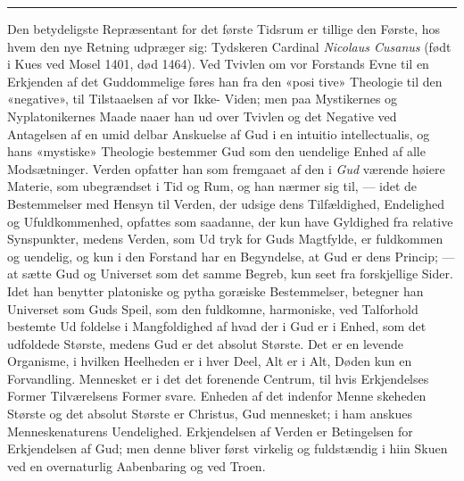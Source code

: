 \documentclass[12pt,a4paper]{book}
\newcommand{\divrule}{\begin{center}\rule{2cm}{0.4pt}\end{center}}
\begin{document}
\divrule

Den betydeligste Repræsentant for det første Tidsrum er
tillige den Første, hos hvem den nye Retning udpræger sig:
Tydskeren Cardinal \emph{Nicolaus Cusanus} (født i Kues ved
Mosel 1401, død 1464). Ved Tvivlen om vor Forstands Evne
til en Erkjenden af det Guddommelige føres han fra den «posi\-%
tive» Theologie til den «negative», til Tilstaaelsen af vor Ikke-%
Viden; men paa Mystikernes og Nyplatonikernes Maade naaer
han ud over Tvivlen og det Negative ved Antagelsen af en umid\-%
delbar Anskuelse af Gud i en intuitio intellectualis, og hans
«mystiske» Theologie bestemmer Gud som den uendelige Enhed
af alle Modsætninger. Verden opfatter han som fremgaaet af
den i \emph{Gud} værende høiere Materie, som ubegrændset i Tid
og Rum, og han nærmer sig til, --- idet de Bestemmelser med
Hensyn til Verden, der udsige dens Tilfældighed, Endelighed
og Ufuldkommenhed, opfattes som saadanne, der kun have
Gyldighed fra relative Synspunkter, medens Verden, som Ud\-%
tryk for Guds Magtfylde, er fuldkommen og uendelig, og kun i
den Forstand har en Begyndelse, at Gud er dens Princip; ---
at sætte Gud og Universet som det samme Begreb, kun seet
fra forskjellige Sider. Idet han benytter platoniske og pytha\-%
goræiske Bestemmelser, betegner han Universet som Guds Speil,
som den fuldkomne, harmoniske, ved Talforhold bestemte Ud\-%
foldelse i Mangfoldighed af hvad der i Gud er i Enhed, som
det udfoldede Største, medens Gud er det absolut Største.
Det er en levende Organisme, i hvilken Heelheden er i hver
Deel, Alt er i Alt, Døden kun en Forvandling. Mennesket er
i det det forenende Centrum, til hvis Erkjendelses Former
Tilværelsens Former svare. Enheden af det indenfor Menne\-%
skeheden Største og det absolut Største er Christus, Gud\-%
mennesket; i ham anskues Menneskenaturens Uendelighed.
Erkjendelsen af Verden er Betingelsen for Erkjendelsen af
Gud; men denne bliver først virkelig og fuldstændig i hiin
Skuen ved en overnaturlig Aabenbaring og ved Troen.
\end{document}
